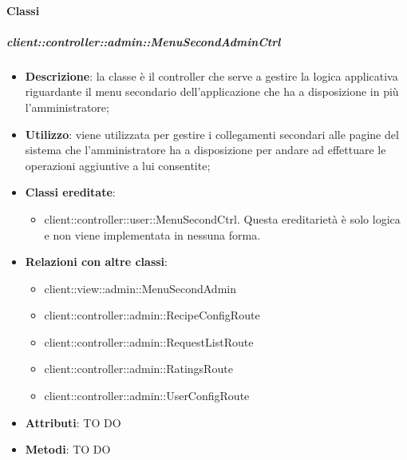 	\paragraph{Classi} %
		\subparagraph{client::controller::admin::MenuSecondAdminCtrl} %
		\label{subp:bdsm_app_client_controller_admin_menusecondadminctrl}
			\begin{itemize}
				\item \textbf{Descrizione}: la classe è il controller che serve a gestire la logica applicativa riguardante il menu secondario dell'applicazione che ha a disposizione in più l'amministratore;
				\item \textbf{Utilizzo}: viene utilizzata per gestire i collegamenti secondari alle pagine del sistema che l'amministratore ha a disposizione per andare ad effettuare le operazioni aggiuntive a lui consentite;
				\item \textbf{Classi ereditate}:
					\begin{itemize}
						\item client::controller::user::MenuSecondCtrl. Questa ereditarietà è solo logica e non viene implementata in nessuna forma.
					\end{itemize}
				\item \textbf{Relazioni con altre classi}:
					\begin{itemize}
						\item client::view::admin::MenuSecondAdmin
						\item client::controller::admin::RecipeConfigRoute
						\item client::controller::admin::RequestListRoute
						\item client::controller::admin::RatingsRoute
						\item client::controller::admin::UserConfigRoute
					\end{itemize}
				\item \textbf{Attributi}: TO DO
				\item \textbf{Metodi}: TO DO
			\end{itemize}

